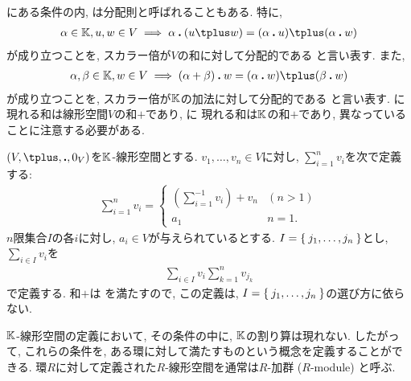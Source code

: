 \begin{remark}
にある条件の内,
は分配則と呼ばれることもある.
特に, 
\begin{align*}
\alpha\in \KK,u,w\in V \implies \alpha\act (u\plus w)=(\alpha\act u)\plus (\alpha\act w)
\end{align*}
が成り立つことを, スカラー倍が$V$の和に対して分配的である
と言い表す.
また,  
\begin{align*}
\alpha,\beta\in\KK, w\in V\implies (\alpha+\beta)\act w=(\alpha\act w)\plus (\beta\act w)
\end{align*}
が成り立つことを, スカラー倍が$\mathbb{K}$の加法に対して分配的である
と言い表す.
に
現れる和は線形空間$V$の和$\plus$であり,
 に
現れる和は$\mathbb{K}$の和$+$であり,
異なっていることに注意する必要がある.
\end{remark}

\begin{remark}
$(V,\plus,\act,0_V)$を$\mathbb{K}$-線形空間とする.
$v_1,\ldots,v_n \in V$に対し,
$\sum_{i=1}^n v_i$を次で定義する:
\begin{align*}
\sum_{i=1}^n v_i
=
\begin{cases}
\left(\sum_{i=1}^{-1} v_i\right)\plus v_n& (n>1)\\
a_1&n=1.
\end{cases}
\end{align*}
$n$限集合$I$の各$i$に対し, $a_i\in V$が与えられているとする.
$I=\Set{j_1,\ldots,j_n}$とし,
$\sum_{i\in I} v_i$を
\begin{align*}
\sum_{i\in I} v_i
\sum_{k=1}^n v_{j_k}
\end{align*}
で定義する.
和$\plus$は
を満たすので,
この定義は,
$I=\Set{j_1,\ldots,j_n}$の選び方に依らない.
\end{remark}


\begin{remark}
  $\mathbb{K}$-線形空間の定義において,
  その条件の中に, $\mathbb{K}$の割り算は現れない.
  したがって,
  これらの条件を, ある環に対して満たすものという概念を定義することができる.
  環$R$に対して定義された$R$-線形空間を通常は$R$-加群 ($R$-module) と呼ぶ.
\end{remark}

